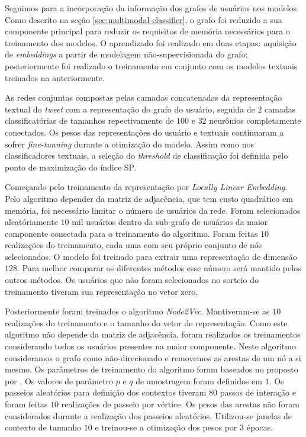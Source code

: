 Seguimos para a incorporação da informação dos grafos de usuários nos modelos.
Como descrito na seção \ref{sec:multimodal-classifier}, o grafo foi reduzido a
sua componente principal para reduzir os requisitos de memória necessários para
o treinamento dos modelos.
O aprendizado foi realizado em duas etapas: aquisição de \textit{embeddings} a
partir de modelagem não-supervisionada do grafo; posteriormente foi realizado o
treinamento em conjunto com os modelos textuais treinados na anteriormente.

As redes conjuntas compostas pelas camadas concatenadas da representação textual
do \textit{tweet} com a representação do grafo do usuário, seguida de 2 camadas
classificatórias de tamanhos repectivamente de $100$ e $32$ neurônios completamente
conectados.
Os pesos das representações do usuário e textuais continuaram a sofrer
\textit{fine-tunning} durante a otimização do modelo.
Assim como nos classificadores textuais, a seleção do \textit{threshold} de
classificação foi definida pelo ponto de maximização do índice SP.

Começando pelo treinamento da representação por \textit{Locally Linear Embedding}.
Pelo algoritmo depender da matriz de adjacência, que tem custo quadrático em
memória, foi necessário limitar o número de usuários da rede.
Foram selecionados aleatóriamente $10$ mil usuários dentro da sub-grafo de
usuários da maior componente conectada para o treinamento do algoritmo.
Foram feitas $10$ realizações do treinamento, cada uma com seu próprio conjunto
de nós selecionados.
O modelo foi treinado para extrair uma representação de dimensão $128$.
Para melhor comparar os diferentes métodos esse número será mantido pelos outros
métodos.
Os usuários que não foram selecionados no sorteio do treinamento tiveram sua
representação no vetor zero.

Posteriormente foram treinados o algoritmo \textit{Node2Vec}.
Mantiveram-se as $10$ realizações do treinamento e o tamanho do vetor de
representação.
Como este algoritmo não depende da matriz de adjacência, foram realizados os
treinamentos considerando todos os usuários presentes na maior componente.
Neste algoritmo consideramos o grafo como não-direcionado e removemos as arestas
de um nó a si mesmo.
Os parâmetros de treinamento do algoritmo foram baseados no proposto por
\citet{grover16}.
Os valores de parâmetro $p$ e $q$ de amostragem foram definidos em $1$.
Os passeios aleatórios para definição dos contextos tiveram $80$ passos
de interação e foram feitas $10$ realizações de passeio por vértice.
Os pesos das arestas não foram considerados durante a realização dos passeios
aleatórios.
Utilizou-se janelas de contexto de tamanho $10$ e treinou-se a otimização dos
pesos por $3$ épocas.

